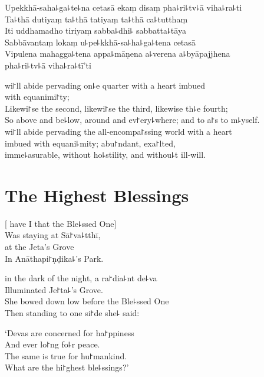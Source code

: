 \clearpage

Upekkhā-saha꜕ga꜕te꜕na cetasā ekaṃ disaṃ pha꜕ri꜕tv꜕ā viha꜕ra꜕ti\\%
Ta꜕thā dutiyaṃ ta꜕thā tatiyaṃ ta꜕thā ca꜕tutthaṃ\\
Iti uddhamadho tiriyaṃ sabba꜕dhi꜕ sabbatta꜕tāya\\
Sabbāvantaṃ lokaṃ u꜕pe꜕kkhā-sa꜕ha꜕ga꜕tena cetasā\\
Vipulena mahagga꜕tena appa꜕māṇena a꜕verena a꜕byāpajjhena\\
\vin pha꜕ri꜕tv꜕ā viha꜕ra꜕tī'ti

\clearpage

 wi꜓ll abide pervading on꜕e quarter with a heart imbued\\%
\vin with equanimi꜓ty;\\
Likewi꜓se the second, likewi꜓se the third, likewise th꜕e fourth;\\
So above and be꜕low, around and ev꜓ery꜕where; and to  a꜓s to m꜕yself.\\
 wi꜓ll abide pervading the all-encompa꜓ssing world with a heart \\
\vin imbued with equani꜕mity; abu꜓ndant, exa꜓lted,\\
\vin imme꜕asurable, without ho꜕stility, and withou꜕t ill-will.

\chapter{The Highest Blessings}%


\begin{leader}
\end{leader}

[ have I  that the Ble꜕ssed One]\\
Was staying at Sā꜓va꜕tthī,\\
 at the Jeta's Grove\\
In Anāthapi꜓ṇḍika꜕'s Park.

 in the dark of the night, a ra꜓dia꜕nt de꜕va\\
Illuminated  Je꜓ta꜕'s Grove.\\
She bowed down low before the Ble꜕ssed One\\
Then standing to one si꜓de she꜕ said:

`Devas are concerned for ha꜓ppiness\\
And ever lo꜓ng fo꜕r peace.\\
The same is true for hu꜓mankind.\\
What  are the hi꜓ghest ble꜕ssings?'

